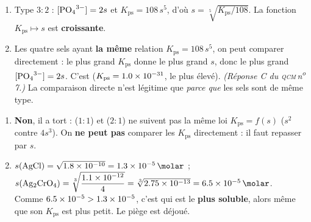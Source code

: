 \documentclass[11pt,a4paper]{article}
\newcommand{\Kps}{K_{\mathrm{ps}}}
\begin{document}
\begin{correction}
\begin{enumerate}[label=\alph*),leftmargin=2em,topsep=2pt,itemsep=2pt]
  \item Type $3{:}2$ : $[\ce{PO4^3-}]=2s$ et $\Kps=108\,s^{5}$, d'où $s=\sqrt[5]{\Kps/108}$. La fonction
        $\Kps\mapsto s$ est \textbf{croissante}.
  \item Les quatre sels ayant \textbf{la même} relation $\Kps=108\,s^{5}$, on peut comparer directement :
        le plus grand $\Kps$ donne le plus grand $s$, donc le plus grand $[\ce{PO4^3-}]=2s$. C'est
         ($\Kps=\num{1{,}0e-31}$, le plus élevé). \emph{(Réponse C du
        \textsc{qcm}\,n\textsuperscript{o}\,7.)} La comparaison directe n'est légitime que \emph{parce que}
        les sels sont de même type.
\end{enumerate}
\end{correction}

\begin{correction}
\begin{enumerate}[label=\alph*),leftmargin=2em,topsep=2pt,itemsep=2pt]
  \item \textbf{Non}, il a tort :  ($1{:}1$) et  ($2{:}1$) ne suivent pas la même
        loi $\Kps=f(s)$ ($s^2$ contre $4s^3$). On \textbf{ne peut pas} comparer les $\Kps$ directement :
        il faut repasser par $s$.
  \item $s(\ce{AgCl})=\sqrt{\num{1{,}8e-10}}=\qty{1{,}3e-5}{\molar}$ ; \\
        $s(\ce{Ag2CrO4})=\sqrt[3]{\dfrac{\num{1{,}1e-12}}{4}}=\sqrt[3]{\num{2{,}75e-13}}
        =\qty{6{,}5e-5}{\molar}$.\\
        Comme $\qty{6{,}5e-5}{}>\qty{1{,}3e-5}{}$, c'est  qui est le \textbf{plus
        soluble}, alors même que son $\Kps$ est plus petit. Le piège est déjoué.
\end{enumerate}
\end{correction}
\end{document}
